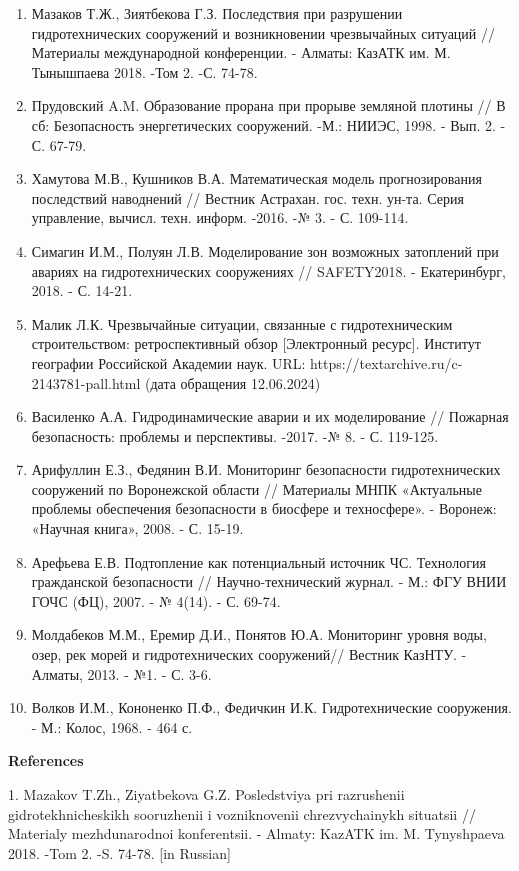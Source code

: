 \begin{enumerate}
\def\labelenumi{\arabic{enumi}.}
\item
  Мазаков Т.Ж., Зиятбекова Г.З. Последствия при разрушении
  гидротехнических сооружений и возникновении чрезвычайных ситуаций //
  Материалы международной конференции. - Алматы: КазАТК им. М.
  Тынышпаева 2018. -Том 2. -С. 74-78.
\item
  Прудовский A.M. Образование прорана при прорыве земляной плотины // В
  сб: Безопасность энергетических сооружений. -М.: НИИЭС, 1998. - Вып.
  2. - С. 67-79.
\item
  Хамутова М.В., Кушников В.А. Математическая модель прогнозирования
  последствий наводнений // Вестник Астрахан. гос. техн. ун-та. Серия
  управление, вычисл. техн. информ. -2016. -№ 3. - С. 109-114.
\item
  Симагин И.М., Полуян Л.В. Моделирование зон возможных затоплений при
  авариях на гидротехнических сооружениях // SAFETY2018. - Екатеринбург,
  2018. - С. 14-21.
\item
  Малик Л.К. Чрезвычайные ситуации, связанные с гидротехническим
  строительством: ретроспективный обзор {[}Электронный ресурс{]}.
  Институт географии Российской Академии наук. URL:
  https://textarchive.ru/c-2143781-pall.html (дата обращения 12.06.2024)
\item
  Василенко А.А. Гидродинамические аварии и их моделирование // Пожарная
  безопасность: проблемы и перспективы. -2017. -№ 8. - С. 119-125.
\item
  Арифуллин Е.З., Федянин В.И. Мониторинг безопасности гидротехнических
  сооружений по Воронежской области // Материалы МНПК «Актуальные
  проблемы обеспечения безопасности в биосфере и техносфере». - Воронеж:
  «Научная книга», 2008. - С. 15-19.
\item
  Арефьева Е.В. Подтопление как потенциальный источник ЧС. Технология
  гражданской безопасности // Научно-технический журнал. - М.: ФГУ ВНИИ
  ГОЧС (ФЦ), 2007. - № 4(14). - С. 69-74.
\item
  Молдабеков М.М., Еремир Д.И., Понятов Ю.А. Мониторинг уровня воды,
  озер, рек морей и гидротехнических сооружений// Вестник КазНТУ. -
  Алматы, 2013. - №1. - С. 3-6.
\item
  Волков И.М., Кононенко П.Ф., Федичкин И.К. Гидротехнические
  сооружения. - М.: Колос, 1968. - 464 с.
\end{enumerate}

\textbf{References}

1. Mazakov T.Zh., Ziyatbekova G.Z. Posledstviya pri razrushenii
gidrotekhnicheskikh sooruzhenii i vozniknovenii chrezvychainykh
situatsii // Materialy mezhdunarodnoi konferentsii. - Almaty: KazATK im.
M. Tynyshpaeva 2018. -Tom 2. -S. 74-78. {[}in Russian{]}

